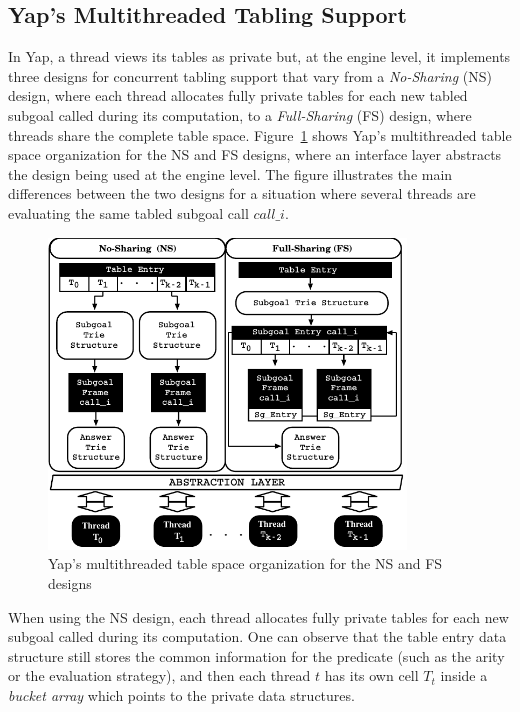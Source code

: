 \documentclass{llncs}
\begin{document}

\subsection{Yap's Multithreaded Tabling Support}

In Yap, a thread views its tables as private but, at the engine level,
it implements three designs for concurrent tabling support that vary
from a \emph{No-Sharing} (NS) design, where each thread allocates
fully private tables for each new tabled subgoal called during its
computation, to a \emph{Full-Sharing} (FS) design, where threads share
the complete table space. Figure~\ref{fig_yap_mt_support} shows Yap's
multithreaded table space organization for the NS and FS designs,
where an interface layer abstracts the design being used at the engine
level. The figure illustrates the main differences between the two
designs for a situation where several threads are evaluating the same
tabled subgoal call $call\_i$.

\begin{figure}[!ht]
\centering
\includegraphics[width=9.5cm]{figures/yap-mt.pdf}
\caption{Yap's multithreaded table space organization for the NS and FS designs}
\label{fig_yap_mt_support}
\end{figure}

When using the NS design, each thread allocates fully private tables
for each new subgoal called during its computation. One can observe
that the table entry data structure still stores the common
information for the predicate (such as the arity or the evaluation
strategy), and then each thread $t$ has its own cell $T_t$ inside a
\emph{bucket array} which points to the private data structures.
\end{document}
